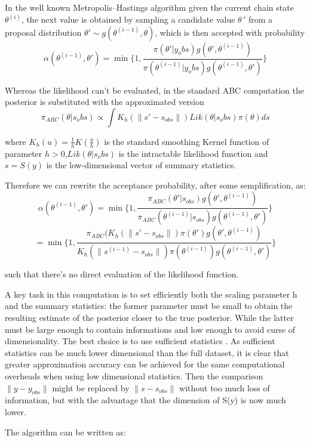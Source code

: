 \documentclass {article}
\begin{document}
In the well known Metropolis–Hastings algorithm given the current chain state $\theta^{(i)}$, the next value is obtained by sampling a candidate value $\theta \,'$ from a proposal distribution $\theta' \sim g(\theta^{(i-1)},\theta)$, which is then accepted with probability
 $$ \alpha(\theta^{(i-1)},\theta')= \min  \{ 1, \frac{\pi(\theta'|y_obs)g(\theta',\theta^{(i-1)})}{\pi(\theta^{(i-1)}|y_obs)g(\theta^{(i-1)},\theta') } \} $$


Whereas the likelihood can't be evaluated, in the standard ABC computation the posterior is substituted with the approximated version $$\pi_{ABC}(\theta|s_obs) \propto \int K_h(\parallel s'-s_{obs}\parallel)Lik(\theta|s_obs)\pi(\theta) ds $$

where ${K_h(u)}  =  \frac{1}{h}  K \left( \frac{u}{h} \right)$ is the standard smoothing Kernel function of parameter $ h>0$,$ Lik(\theta|s_obs)$ is the intractable likelihood function and $s=S(y)$ is the low-dimensional vector of summary statistics.

Therefore we can rewrite the acceptance probability, after some semplification, as:
 $$ \alpha(\theta^{(i-1)},\theta')= \min  \{ 1, \frac{\pi_{ABC}(\theta'|s_{obs})g(\theta',\theta^{(i-1)})}{\pi_{ABC}(\theta^{(i-1)}|s_{obs})g(\theta^{(i-1)},\theta') } \} $$
 $$ =\min  \{ 1, \frac{\pi_{ABC}(K_h(\parallel s'-s_{obs}\parallel)   \pi(\theta')g(\theta',\theta^{(i-1)})}{K_h(\parallel s^{(i-1)}-s_{obs}\parallel)   \pi(\theta^{(i-1)})g(\theta^{(i-1)},\theta') } \} $$

such that there's no direct evaluation of the likelihood function.

A key task in this computation is to set efficiently both the scaling parameter h and the summary statistics:
the former parameter must be small to obtain the resulting estimate of the posterior closer to the true posterior. While the latter must be large enough to contain informations and low enough to avoid curse of dimensionality.
The best choice is to use sufficient statistics \cite{prangle2015summary}. As sufficient statistics can be much lower dimensional than the full dataset, it is clear that greater approximation accuracy can be achieved for the same computational overheads when using low dimensional statistics.
Then the comparison $\parallel y-y_{obs} \parallel$ might be replaced by $\parallel s-s_{obs} \parallel$ without too much loss of information, but with the advantage that the dimension of S(y) is now much lower.

The algorithm \cite{fan2018abc} can be written as:
\end{document}
